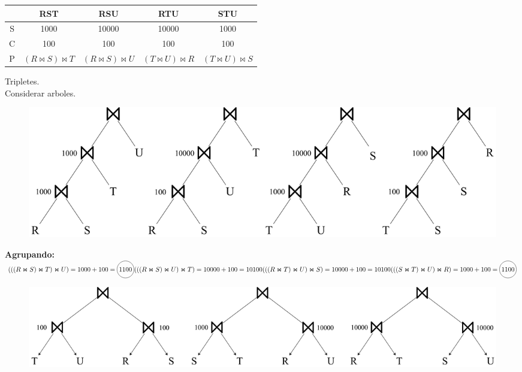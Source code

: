 \documentclass{templateNote}
\begin{document}
\begin{enumerate}
\begin{enumerate}[label=\alph*)]
                \begin{tabular}{|c|c|c|c|c|}
                    \hline
                    & RST & RSU & RTU & STU \\
                    \hline
                    S & 1000 & 10000 & 10000 & 1000 \\
                    \hline
                    C & 100 & 100 & 100 & 100  \\
                    \hline
                    P & $(R \Join S) \Join T$ & $(R \Join S) \Join U$ & $(T \Join U) \Join R$ & $(T \Join U) \Join S$ \\
                    \hline
                \end{tabular}
                
                \noindent Tripletes. \\Considerar arboles. \\

                \begin{figure}[H]
                    \centering
                    \includegraphics[width=\textwidth]{img/img1.png}
                \end{figure}
                
                \noindent \textbf{Agrupando:} \\
                \begin{math}
                    (((R \Join S ) \Join T ) \Join U) = 1000 + 100 = \tikz[baseline=(char.base)]{\node[shape=circle,draw,inner sep=2pt] (char) {$1100$};} \\
                    (((R \Join S ) \Join U ) \Join T) = 10000 + 100 = 10100 \\
                    (((R \Join T ) \Join U ) \Join S) = 10000 + 100 = 10100 \\
                    (((S \Join T ) \Join U ) \Join R) = 1000 + 100 = \tikz[baseline=(char.base)]{\node[shape=circle,draw,inner sep=2pt] (char) {$1100$};} \\
                \end{math}

                \begin{figure}[H]
                    \centering
                    \includegraphics[width=\textwidth]{img/img2.png}
                \end{figure}


\end{enumerate}
\end{enumerate}
\end{document}
